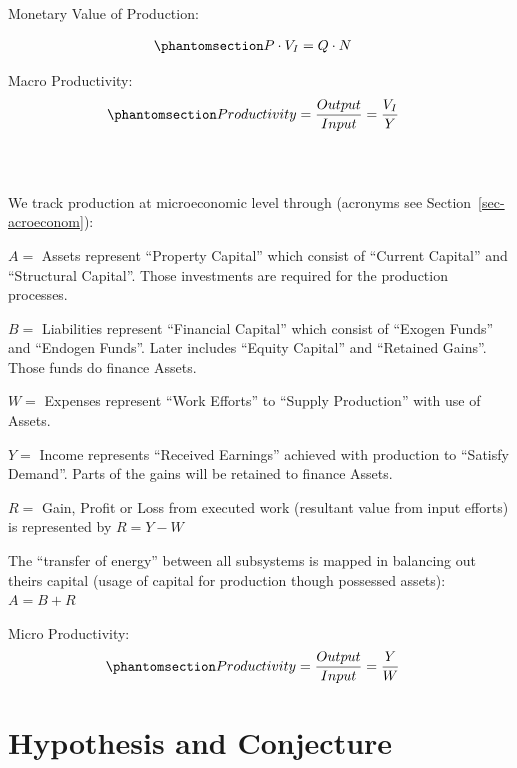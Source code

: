 \documentclass[
  letterpaper,
  DIV=11,
  numbers=noendperiod]{scrartcl}
\begin{document}
Monetary Value of Production:

\begin{equation}\phantomsection\label{eq-moneyquant}{\begin{split} &
P \cdot V_I = Q \cdot N
\end{split}}\end{equation}

Macro Productivity:
\begin{equation}\phantomsection\label{eq-productivity}{\begin{split} &
Productivity = \frac{Output}{Input} = \frac{V_I}{Y}
\end{split}}\end{equation}\\
\strut \\

We track production at microeconomic level through (acronyms see
Section~\ref{sec-acroeconom}):

\(A =\) Assets represent ``Property Capital'' which consist of ``Current
Capital'' and ``Structural Capital''. Those investments are required for
the production processes.

\(B =\) Liabilities represent ``Financial Capital'' which consist of
``Exogen Funds'' and ``Endogen Funds''. Later includes ``Equity
Capital'' and ``Retained Gains''. Those funds do finance Assets.

\(W =\) Expenses represent ``Work Efforts'' to ``Supply Production''
with use of Assets.

\(Y =\) Income represents ``Received Earnings'' achieved with production
to ``Satisfy Demand''. Parts of the gains will be retained to finance
Assets.

\(R =\) Gain, Profit or Loss from executed work (resultant value from
input efforts) is represented by \(R = Y - W\)

The ``transfer of energy'' between all subsystems is mapped in balancing
out theirs capital (usage of capital for production though possessed
assets): \(A = B + R\)

Micro Productivity:
\begin{equation}\phantomsection\label{eq-microprod}{\begin{split} &
Productivity = \frac{Output}{Input} = \frac{Y}{W}
\end{split}}\end{equation}

\hfill\break
\hfill\break

\section{Hypothesis and Conjecture}\label{sec-hypothesis}
\end{document}
